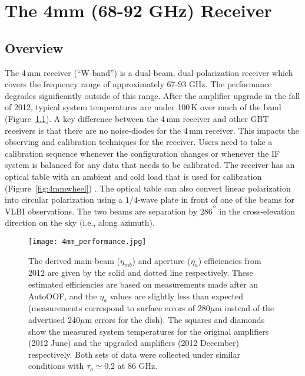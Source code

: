 \chapter{The 4mm (68-92 GHz) Receiver}\label{chap:wband}
 

\section{Overview} The 4\,mm receiver (``W-band'') is a dual-beam,
dual-polarization receiver which covers the frequency range of
approximately 67-93 GHz.  The performance degrades significantly
outside of this range.  After the amplifier upgrade in the fall of
2012, typical system temperatures are under 100\,K over much of the
band (Figure~\ref{fig:wperformance}).  A key difference between the
4\,mm receiver and other GBT receivers is that there are no
noise-diodes for the 4\,mm receiver.  This impacts the observing and
calibration techniques for the receiver.  Users need to take a
calibration sequence whenever the configuration changes or whenever
the IF system is balanced for any data that needs to be calibrated.
The receiver has an optical table with an ambient and cold load that
is used for calibration (Figure~\ref{fig:4mmwheel}) .  The optical
table can also convert linear polarization into circular polarization
using a $1/4$-wave plate in front of one of the beams for VLBI
observations.  The two beams are separation by $286^{\prime\prime}$ in
the cross-elevation direction on the sky (i.e., along azimuth).


\begin{figure}[!h]
\begin{center}
\texttt{[image: 4mm\_performance.jpg]}
\caption[]{The derived main-beam ($\eta_{mb}$) and aperture
  ($\eta_{a}$) efficiencies from 2012 are given by the solid and
  dotted line respectively.  These estimated efficiencies are based on
  measurements made after an AutoOOF, and the $\eta_{a}$ values are
  slightly less than expected (measurements correspond to surface
  errors of 280$\mu$m instead of the advertised 240$\mu$m errors for
  the dish).  The squares and diamonds show the measured system
  temperatures for the original amplifiers (2012 June) and the upgraded
  amplifiers (2012 December) respectively.  Both sets of data were
  collected under similar conditions with $\tau_o \simeq 0.2$ at 86
  GHz.  \label{fig:wperformance} }
\end{center}
\end{figure}

